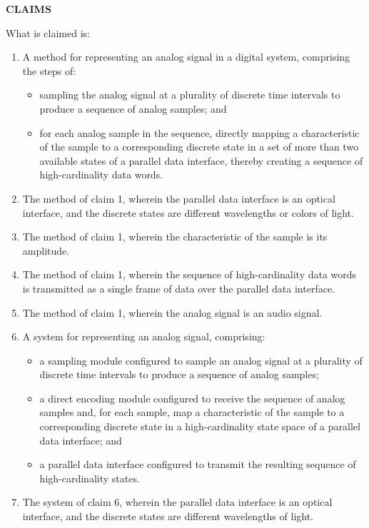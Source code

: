 \documentclass[11pt,letterpaper]{article}
\begin{document}
\thispagestyle{empty}

\begin{center}
    \textbf{\large CLAIMS}
\end{center}

\vspace{0.4cm}
\noindent What is claimed is:

\begin{enumerate}[label=\textbf{\arabic*.}, leftmargin=0.5in, itemsep=0.4cm]
    \item A method for representing an analog signal in a digital system, comprising the steps of:
    \begin{itemize}[leftmargin=0.3in, noitemsep]
        \item sampling the analog signal at a plurality of discrete time intervals to produce a sequence of analog samples; and
        \item for each analog sample in the sequence, directly mapping a characteristic of the sample to a corresponding discrete state in a set of more than two available states of a parallel data interface, thereby creating a sequence of high-cardinality data words.
    \end{itemize}

    \item The method of claim 1, wherein the parallel data interface is an optical interface, and the discrete states are different wavelengths or colors of light.

    \item The method of claim 1, wherein the characteristic of the sample is its amplitude.

    \item The method of claim 1, wherein the sequence of high-cardinality data words is transmitted as a single frame of data over the parallel data interface.

    \item The method of claim 1, wherein the analog signal is an audio signal.

    \item A system for representing an analog signal, comprising:
    \begin{itemize}[leftmargin=0.3in, noitemsep]
        \item a sampling module configured to sample an analog signal at a plurality of discrete time intervals to produce a sequence of analog samples;
        \item a direct encoding module configured to receive the sequence of analog samples and, for each sample, map a characteristic of the sample to a corresponding discrete state in a high-cardinality state space of a parallel data interface; and
        \item a parallel data interface configured to transmit the resulting sequence of high-cardinality states.
    \end{itemize}

    \item The system of claim 6, wherein the parallel data interface is an optical interface, and the discrete states are different wavelengths of light.
\end{enumerate}
\end{document}

